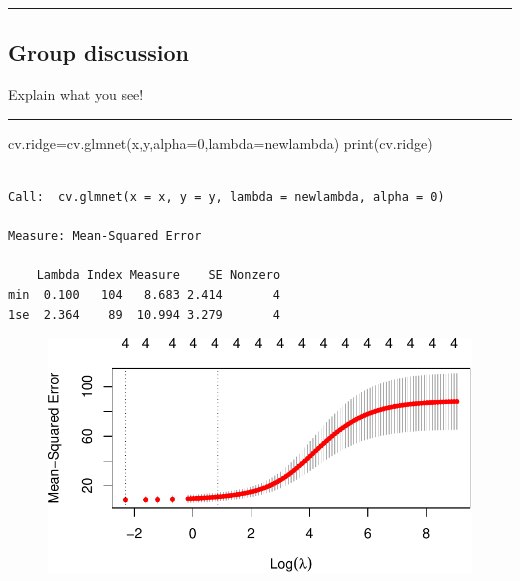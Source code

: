 \documentclass[
  letterpaper,
  DIV=11,
  numbers=noendperiod]{scrartcl}
\newenvironment{Shaded}{\begin{snugshade}}{\end{snugshade}}
\newcommand{\AttributeTok}[1]{\textcolor[rgb]{0.40,0.45,0.13}{#1}}
\newcommand{\CommentTok}[1]{\textcolor[rgb]{0.37,0.37,0.37}{#1}}
\newcommand{\DecValTok}[1]{\textcolor[rgb]{0.68,0.00,0.00}{#1}}
\newcommand{\FunctionTok}[1]{\textcolor[rgb]{0.28,0.35,0.67}{#1}}
\newcommand{\NormalTok}[1]{\textcolor[rgb]{0.00,0.23,0.31}{#1}}
\newcommand{\OtherTok}[1]{\textcolor[rgb]{0.00,0.23,0.31}{#1}}
\begin{document}
\begin{center}\rule{0.5\linewidth}{0.5pt}\end{center}

\hypertarget{group-discussion-1}{%
\subsection{Group discussion}\label{group-discussion-1}}

Explain what you see!

\begin{center}\rule{0.5\linewidth}{0.5pt}\end{center}

\begin{Shaded}
\begin{Highlighting}[]
\NormalTok{cv.ridge}\OtherTok{=}\FunctionTok{cv.glmnet}\NormalTok{(x,y,}\AttributeTok{alpha=}\DecValTok{0}\NormalTok{,}\AttributeTok{lambda=}\NormalTok{newlambda)}
\FunctionTok{print}\NormalTok{(cv.ridge)}
\end{Highlighting}
\end{Shaded}

\begin{verbatim}

Call:  cv.glmnet(x = x, y = y, lambda = newlambda, alpha = 0) 

Measure: Mean-Squared Error 

    Lambda Index Measure    SE Nonzero
min  0.100   104   8.683 2.414       4
1se  2.364    89  10.994 3.279       4
\end{verbatim}

\begin{Shaded}
\end{Shaded}

\begin{figure}[H]

{\centering \includegraphics{L7_files/figure-pdf/unnamed-chunk-14-1.pdf}

}

\end{figure}
\end{document}
